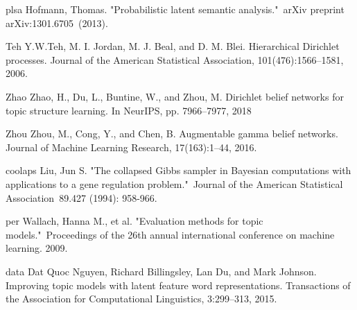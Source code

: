 \begin{thebibliography}{999}
\bibitem
{plsa}
Hofmann, Thomas. "Probabilistic latent semantic analysis." arXiv preprint arXiv:1301.6705 (2013).

\bibitem
{Teh}
Y.W.Teh, M. I. Jordan, M. J. Beal, and D. M. Blei. Hierarchical Dirichlet processes. Journal of the American Statistical Association, 101(476):1566–1581, 2006.

\bibitem
{Zhao}
Zhao, H., Du, L., Buntine, W., and Zhou, M. Dirichlet
belief networks for topic structure learning. In NeurIPS,
pp. 7966–7977, 2018

\bibitem
{Zhou}
Zhou, M., Cong, Y., and Chen, B. Augmentable gamma
belief networks. Journal of Machine Learning Research,
17(163):1–44, 2016.

\bibitem
{coolaps}
Liu, Jun S. "The collapsed Gibbs sampler in Bayesian computations with applications to a gene regulation problem." Journal of the American Statistical Association 89.427 (1994): 958-966.

\bibitem
{per}
Wallach, Hanna M., et al. "Evaluation methods for topic models." Proceedings of the 26th annual international conference on machine learning. 2009.

\bibitem
{data}
Dat Quoc Nguyen, Richard Billingsley, Lan Du, and Mark Johnson. Improving topic models with latent feature word representations. Transactions of the Association for Computational Linguistics, 3:299–313, 2015.

\end{thebibliography}
